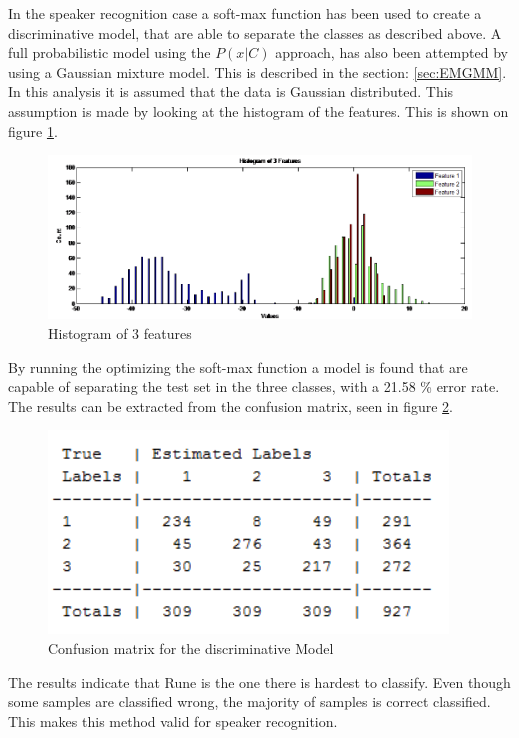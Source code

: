 In the speaker recognition case a soft-max function has been used to create a discriminative model, that are able to separate the classes as described above. A full probabilistic model using the $P(x|C)$ approach, has also been attempted by using a Gaussian mixture model. This is described in the section: \ref{sec:EMGMM}. In this analysis it is assumed that the data is Gaussian distributed. This assumption is made by looking at the histogram of the features. This is shown on figure \ref{fig:featurehist}.

\begin{figure}[H]
\centering
\includegraphics[scale=0.6]{billeder/histoffeature}
\caption{Histogram of 3 features}
\label{fig:featurehist}
\end{figure}

By running the optimizing the soft-max function a model is found that are capable of separating the test set in the three classes, with a 21.58 \% error rate. The results can be extracted from the confusion matrix, seen in figure \ref{fig:conmatprob}. 

\begin{figure}[H]
\centering
\includegraphics[scale=0.8]{billeder/conmatprop}
\caption{Confusion matrix for the discriminative Model }
\label{fig:conmatprob}
\end{figure}

The results indicate that Rune is the one there is hardest to classify. Even though some samples are classified wrong, the majority of samples is correct classified. This makes this method valid for speaker recognition. \\

